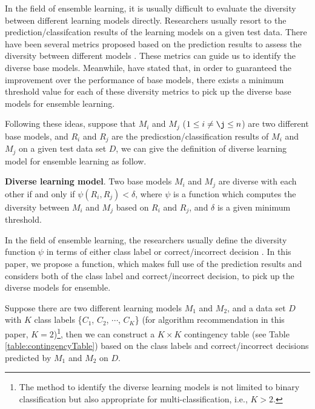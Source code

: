 \documentclass[acmsmall]{acmart}
\begin{document}
In the field of ensemble learning, it is usually difficult to
evaluate the diversity between different learning models directly.
Researchers usually resort to the prediction/classifcation results
of the learning models on a given test data. There have been several
metrics proposed based on the prediction results to assess the
diversity between different models
\cite{kuncheva2003measures,lee2013automatic,cunningham2000diversity,dietterich2000experimental}.
These metrics can guide us to identify the diverse base models.
Meanwhile, \cite{kuncheva2003measures} have stated that, in order to
guaranteed the improvement over the performance of base models,
there exists a minimum threshold value for each of these diversity
metrics to pick up the diverse base models for ensemble learning.

Following these ideas, suppose that $M_i$ and $M_j$ ($1\leq i\neq\j
\leq n$) are two different base models, and $R_i$ and $R_j$ are the
predicstion/classification results of $M_i$ and $M_j$ on a given
test data set $D$, we can give the definition of diverse learning
model for ensemble learning as follow.

\begin{definition}\textbf{Diverse learning model}\label{def:diverseModel}.
	Two base models $M_i$ and $M_j$ are diverse with each other if and
	only if $\psi(R_i, R_j) < \delta$, where $\psi$ is a function which
	computes the diversity between $M_i$ and $M_j$ based on $R_i$ and
	$R_j$, and $\delta$ is a given minimum threshold.
\end{definition}

In the field of ensemble learning, the
researchers usually define the diversity function $\psi$ in terms of
either class label or correct/incorrect decision
\cite{kohavi1996bias,dietterich2000experimental,Ho1998Random,Giacinto2000design,kuncheva2003measures}.
In this paper, we propose a function, which makes full use of the
prediction results and considers both of the class label and
correct/incorrect decision, to pick up the diverse models for
ensemble.

Suppose there are two different learning models $M_1$ and $M_2$, and
a data set $D$ with $K$ class labels \{$C_1$, $C_2$, $\cdots$,
$C_K$\} (for algorithm recommendation in this paper, $K =
2$)\footnote{The method to identify the diverse learning models is
	not limited to binary classification but also appropriate for
	multi-classification, i.e., $K > 2$.}, then we can construct a $K\times K$ contingency table (see
Table \ref{table:contingencyTable}) based on the class labels and
correct/incorrect decisions predicted by $M_1$ and $M_2$ on $D$.
\end{document}
